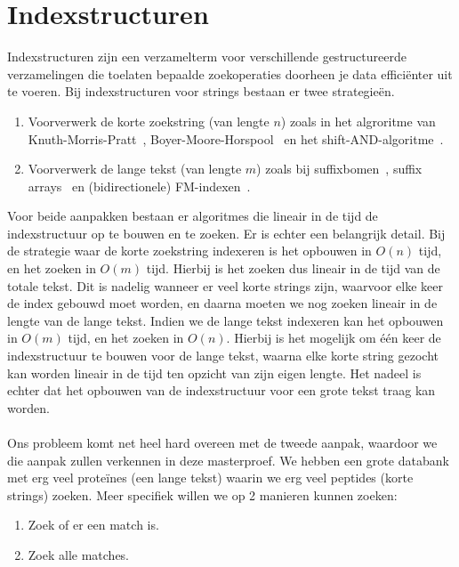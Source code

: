 \chapter{Indexstructuren}\label{ch:indexstructuren}
Indexstructuren zijn een verzamelterm voor verschillende gestructureerde verzamelingen die toelaten bepaalde zoekoperaties doorheen je data efficiënter uit te voeren.
Bij indexstructuren voor strings bestaan er twee strategieën.
\begin{enumerate}
    \item Voorverwerk de korte zoekstring (van lengte $n$) zoals in het algroritme van Knuth-Morris-Pratt~\cite{knuth-morris-pratt}, Boyer-Moore-Horspool~\cite{boyer-moore-horspool} en het shift-AND-algoritme~\cite{shift-and}.
    \item Voorverwerk de lange tekst (van lengte $m$) zoals bij suffixbomen~\cite{mcCreight_first_suffixtree}, suffix arrays~\cite{suffix_array_first_mention} en (bidirectionele) FM-indexen~\cite{fm_index, bi-directional_fm_index}.
\end{enumerate}
Voor beide aanpakken bestaan er algoritmes die lineair in de tijd de indexstructuur op te bouwen en te zoeken.
Er is echter een belangrijk detail.
Bij de strategie waar de korte zoekstring indexeren is het opbouwen in $O(n)$ tijd, en het zoeken in $O(m)$ tijd.
Hierbij is het zoeken dus lineair in de tijd van de totale tekst.
Dit is nadelig wanneer er veel korte strings zijn, waarvoor elke keer de index gebouwd moet worden, en daarna moeten we nog zoeken lineair in de lengte van de lange tekst.
Indien we de lange tekst indexeren kan het opbouwen in $O(m)$ tijd, en het zoeken in $O(n)$.
Hierbij is het mogelijk om één keer de indexstructuur te bouwen voor de lange tekst, waarna elke korte string gezocht kan worden lineair in de tijd ten opzicht van zijn eigen lengte.
Het nadeel is echter dat het opbouwen van de indexstructuur voor een grote tekst traag kan worden.
\\ \\
Ons probleem komt net heel hard overeen met de tweede aanpak, waardoor we die aanpak zullen verkennen in deze masterproef.
We hebben een grote databank met erg veel proteïnes (een lange tekst) waarin we erg veel peptides (korte strings) zoeken.
Meer specifiek willen we op 2 manieren kunnen zoeken:
\begin{enumerate}
    \item Zoek of er een match is.
    \item Zoek alle matches.
\end{enumerate}
